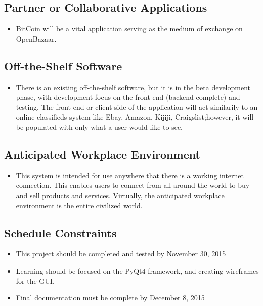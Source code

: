 \documentclass{article}
\begin{document}
\subsection{Partner or Collaborative Applications}
\begin{itemize}

\item
BitCoin will be a vital application serving as the medium of exchange on OpenBazaar.

\end{itemize}

\subsection{Off-the-Shelf Software}
\begin{itemize}
	
\item
There is an existing off-the-shelf software, but it is in the beta development phase, with development focus on the front end (backend complete) and testing. The front end or client side of the application will act similarily to an online classifieds system like Ebay, Amazon, Kijiji, Craigslist;however, it will be populated with only what a user would like to see.	

	
\end{itemize}

\subsection{Anticipated Workplace Environment}
\begin{itemize}
	
\item
This system is intended for use anywhere that there is a working internet connection. This enables users to connect from all around the world to buy and sell products and services. Virtually, the anticipated workplace environment is the entire civilized world.
	
	
\end{itemize}

\subsection{Schedule Constraints}
\begin{itemize}
	
\item
This project should be completed and tested by November 30, 2015
\item
Learning should be focused on the PyQt4 framework, and creating wireframes for the GUI.
\item
Final documentation must be complete by December 8, 2015
	
\end{itemize}
\end{document}

